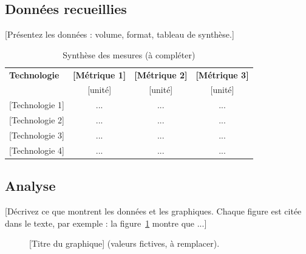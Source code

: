 \documentclass[conference,a4paper]{IEEEtran}
\begin{document}
\subsection{Données recueillies}
[Présentez les données : volume, format, tableau de synthèse.]

\begin{table}[htbp]
\caption{Synthèse des mesures (à compléter)}
\label{tab:resultats}
\centering
\begin{tabular}{@{}lccc@{}}
\toprule
\textbf{Technologie} & \textbf{[Métrique 1]} & \textbf{[Métrique 2]} & \textbf{[Métrique 3]} \\
 & [unité] & [unité] & [unité] \\
\midrule
{[Technologie 1]} & ... & ... & ... \\
{[Technologie 2]} & ... & ... & ... \\
{[Technologie 3]} & ... & ... & ... \\
{[Technologie 4]} & ... & ... & ... \\
\bottomrule
\end{tabular}
\end{table}

\subsection{Analyse}
[Décrivez ce que montrent les données et les graphiques. Chaque figure
est citée dans le texte, par exemple : la figure~\ref{fig:exemple}
montre que ...]

\begin{figure}[htbp]
\centering
{}
\caption{[Titre du graphique] (valeurs fictives, à remplacer).}
\label{fig:exemple}
\end{figure}
\end{document}
